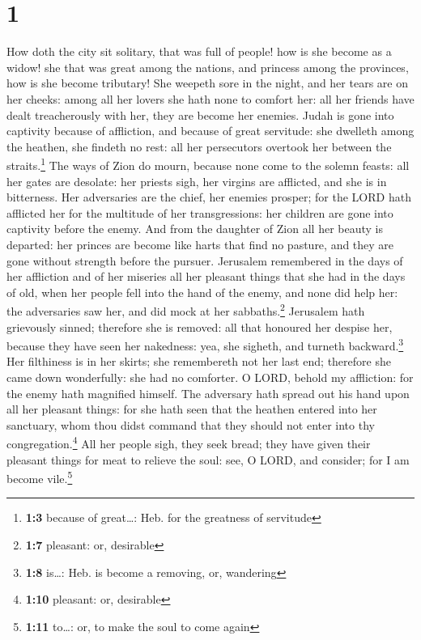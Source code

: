 \hypertarget{section}{%
\section{1}\label{section}}

 How doth the city sit solitary, that was full of people!
how is she become as a widow! she that was great among the nations, and
princess among the provinces, how is she become tributary!
 She weepeth sore in the night, and her tears are on her
cheeks: among all her lovers she hath none to comfort her: all her
friends have dealt treacherously with her, they are become her enemies.
 Judah is gone into captivity because of affliction, and
because of great servitude: she dwelleth among the heathen, she findeth
no rest: all her persecutors overtook her between the
straits.\footnote{\textbf{1:3} because of great\ldots: Heb. for the
  greatness of servitude}  The ways of Zion do mourn,
because none come to the solemn feasts: all her gates are desolate: her
priests sigh, her virgins are afflicted, and she is in bitterness.
 Her adversaries are the chief, her enemies prosper; for
the LORD hath afflicted her for the multitude of her transgressions: her
children are gone into captivity before the enemy.  And
from the daughter of Zion all her beauty is departed: her princes are
become like harts that find no pasture, and they are gone without
strength before the pursuer.  Jerusalem remembered in the
days of her affliction and of her miseries all her pleasant things that
she had in the days of old, when her people fell into the hand of the
enemy, and none did help her: the adversaries saw her, and did mock at
her sabbaths.\footnote{\textbf{1:7} pleasant: or, desirable}
 Jerusalem hath grievously sinned; therefore she is
removed: all that honoured her despise her, because they have seen her
nakedness: yea, she sigheth, and turneth backward.\footnote{\textbf{1:8}
  is\ldots: Heb. is become a removing, or, wandering}  Her
filthiness is in her skirts; she remembereth not her last end; therefore
she came down wonderfully: she had no comforter. O LORD, behold my
affliction: for the enemy hath magnified himself.  The
adversary hath spread out his hand upon all her pleasant things: for she
hath seen that the heathen entered into her sanctuary, whom thou didst
command that they should not enter into thy congregation.\footnote{\textbf{1:10}
  pleasant: or, desirable}  All her people sigh, they
seek bread; they have given their pleasant things for meat to relieve
the soul: see, O LORD, and consider; for I am become vile.\footnote{\textbf{1:11}
  to\ldots: or, to make the soul to come again}

